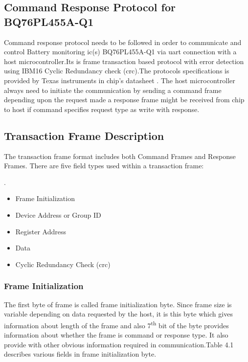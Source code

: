 \subsection{Command Response Protocol for BQ76PL455A-Q1}
Command response protocol needs to be followed in order to communicate and control Battery monitoring \acrshort{ic}(s) BQ76PL455A-Q1 via \acrshort{uart} connection with a host microcontroller.Its is frame transaction based protocol with error detection using IBM16 Cyclic Redundancy check (\acrshort{crc}).The  protocols specifications is provided by Texas instruments in chip's datasheet \cite{ti:pl455}. The host microcontroller always need to initiate the communication by sending a command frame depending upon the request made a response frame might be received  from chip to host if command specifies request type as write with response.

\subsection{Transaction Frame Description}
The transaction frame format includes both Command Frames and Response Frames. There are five field types used within a transaction frame:

.\begin{itemize}
\item Frame Initialization
\item Device Address or Group ID
\item Register Address
\item Data
\item Cyclic Redundancy Check (\acrshort{crc})
\end{itemize}

\subsubsection{Frame Initialization}
The first byte of frame is called frame initialization byte. Since frame size is variable depending on data requested by the host, it is this byte which gives information about length of the frame and also 7\textsuperscript{th} bit of the byte provides information about whether the frame is command or response type. It also provide with other obvious information required in communication.Table 4.1 describes various fields in frame initialization byte.

